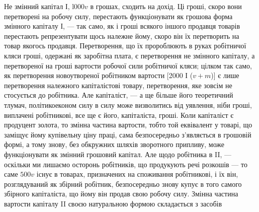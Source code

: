 Не змінний капітал І, l$000v$ в грошах, сходить на дохід. Ці гроші,
скоро вони перетворені на робочу силу, перестають функціонувати як
грошова форма змінного капіталу І, — так само, як і гроші всякого іншого
продавця товарів перестають репрезентувати щось належне йому,
скоро він їх перетворить на товар якогось продавця. Перетворення, що
їх пророблюють в руках робітничої кляси гроші, одержані як заробітна
плата, є перетворення не змінного капіталу, а перетвореної на гроші
вартости робочої сили робітничої кляси; цілком так само, як перетворення
новоутвореної робітником вартости [2000 І ($v + m$)] є лише перетворення
належного капіталістові товару, перетворення, яке зовсім
не стосується до робітника. Але капіталіст, — а ще більше його теоретичний
тлумач, політикоеконом силу в силу може визволитись від уявлення,
ніби гроші, виплачені робітникові, все ще є його, капіталіста, гроші.
Коли капіталіст є продуцент золота, то змінна частина вартости, тобто
той еквівалент у товарі, що заміщує йому купівельну ціну праці, сама
безпосередньо з’являється в грошовій формі, а тому знову, без обкружних
шляхів зворотного припливу, може функціонувати як змінний грошовий
капітал. Але щодо робітника в II, — оскільки ми лишаємо осторонь
робітників, що продукують речі розкошів — то саме $500v$ існує в товарах,
призначених на споживання робітникові, і їх він, розглядуваний як
збірний робітник, безпосередньо знову купує в того самого збірного
капіталіста, що йому він продав свою робочу силу. Змінна частина
вартости капіталу II своєю натуральною формою складається з засобів
\parbreak{}  %

